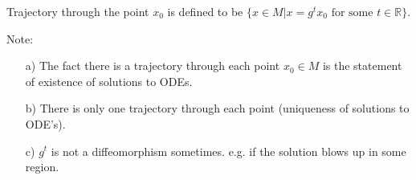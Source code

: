 Trajectory through the point $x_0$ is defined to be $\{x \in M | x = g^t x_0 \, \, \text{for some} \, \, t \in \mathbb{R}\}$.

Note:
\begin{itemize}
\item[a)] The fact there is a trajectory through each point $x_0 \in M$ is the statement of existence of solutions to ODEs.
\item[b)] There is only one trajectory through each point (uniqueness of solutions to ODE's).
\item[c)] $g^t$ is not a diffeomorphism sometimes. e.g. if the solution blows up in some region.
\end{itemize}